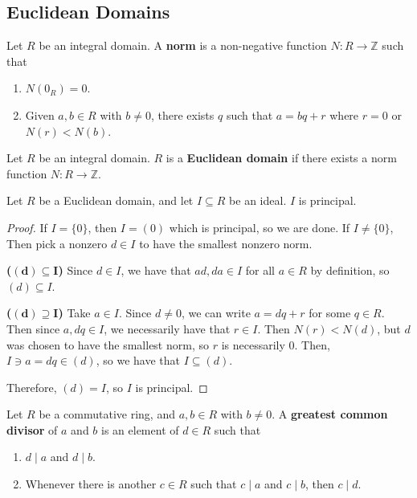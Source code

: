 \documentclass [12pt] {article}
\newcommand{\Z}{\mathbb{Z}}
\newenvironment{definition}[1]{\begin{tcolorbox}[title={Definition: #1},colback=blue!5!white,colframe=black!75!blue]}{\end{tcolorbox}}
\newenvironment{theorem}[1]{\begin{tcolorbox}[title={Theorem #1},colback=green!5!white,colframe=black!75!green]}{\end{tcolorbox}}
\renewcommand{\bf}[1]{\textbf{{#1}}}
\begin{document}
\subsection{Euclidean Domains}
\begin{definition}{Norm}
    Let $R$ be an integral domain. A \bf{norm} is a non-negative function $N : R \to \Z$ such that
    \begin{enumerate}[label=(\arabic*)]
        \item $N(0_R) = 0$.
        \item Given $a, b \in R$ with $b \neq 0$, there exists $q$ such that $a = bq + r$ where
            $r = 0$ or $N(r) < N(b)$.
    \end{enumerate}
\end{definition}
\begin{definition}{Euclidean Domain}
    Let $R$ be an integral domain. $R$ is a \bf{Euclidean domain} if there exists a norm function
    $N : R \to \Z$.
\end{definition}

\begin{theorem}{}
    Let $R$ be a Euclidean domain, and let $I \subseteq R$ be an ideal. $I$ is principal.
\end{theorem}
\begin{proof}
    If $I = \{ 0 \}$, then $I = (0)$ which is principal, so we are done. If $I \neq \{ 0 \}$, Then
    pick a nonzero $d \in I$ to have the smallest nonzero norm.
    \vspace{0.5em}

    \bf{($\bm{(d) \subseteq I}$)}
    Since $d \in I$, we have that $ad, da \in I$ for all $a \in R$ by definition, so $(d) \subseteq I$.
    \vspace{0.5em}

    \bf{($\bm{(d) \supseteq I}$)}
    Take $a \in I$. Since $d \neq 0$, we can write $a = dq + r$ for some $q \in R$. Then since $a,
    dq \in I$, we necessarily have that $r \in I$. Then $N(r) < N(d)$, but $d$ was chosen to have
    the smallest norm, so $r$ is necessarily $0$. Then, $I \ni a = dq \in (d)$, so we have that
    $I \subseteq (d)$.

    \vspace{0.5em}
    Therefore, $(d) = I$, so $I$ is principal.
\end{proof}

\begin{definition}{Greatest Common Divisor (Euclidean Domains)}
    Let $R$ be a commutative ring, and $a, b \in R$ with $b \neq 0$. A \bf{greatest common divisor}
    of $a$ and $b$ is an element of $d \in R$ such that
    \begin{enumerate}[label=(\arabic*)]
        \item $d \mid a$ and $d \mid b$.
        \item Whenever there is another $c \in R$ such that $c \mid a$ and $c \mid b$, then
            $c \mid d$.
    \end{enumerate}
\end{definition}
\end{document}
